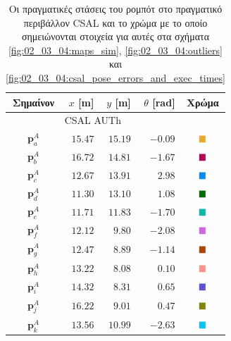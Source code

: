 \begin{table}\centering
  \begin{tabular} {c|rrrc}                                                 \toprule
    Σημαίνον       & $x$ [m]   & $y$  [m]  & $\theta$ [rad]  & Χρώμα    \\ \toprule
    \multicolumn{4}{c}{CSAL AUTh}                                       \\ \midrule
    $\bm{p}_a^A$   & $15.47$   & $15.19$   & $-0.09$         & $\squarea$ \\
    $\bm{p}_b^A$   & $16.72$   & $14.81$   & $-1.67$         & $\squareb$ \\
    $\bm{p}_c^A$   & $12.67$   & $13.91$   & $2.98$          & $\squarec$ \\
    $\bm{p}_d^A$   & $11.30$   & $13.10$   & $1.08$          & $\squared$ \\
    $\bm{p}_e^A$   & $11.71$   & $11.83$   & $-1.70$         & $\squaree$ \\
    $\bm{p}_f^A$   & $12.12$   & $9.80$    & $-2.08$         & $\squaref$ \\
    $\bm{p}_g^A$   & $12.47$   & $8.89$    & $-1.14$         & $\squareg$ \\
    $\bm{p}_h^A$   & $13.22$   & $8.08$    & $0.10$          & $\squareh$ \\
    $\bm{p}_i^A$   & $14.32$   & $8.31$    & $0.65$          & $\squarei$ \\
    $\bm{p}_j^A$   & $16.22$   & $9.01$    & $0.47$          & $\squarej$ \\
    $\bm{p}_k^A$   & $13.56$   & $10.99$   & $-2.63$         & $\squarek$ \\ \bottomrule
  \end{tabular}
  \caption{\small Οι πραγματικές στάσεις του ρομπότ στο πραγματικό περιβάλλον
           CSAL και το χρώμα με το οποίο σημειώνονται στοιχεία για αυτές στα
           σχήματα \ref{fig:02_03_04:maps_sim}, \ref{fig:02_03_04:outliers} και
           \ref{fig:02_03_04:csal_pose_errors_and_exec_times}}
  \label{tbl:02_03_04:true_poses_experiment}
\end{table}

